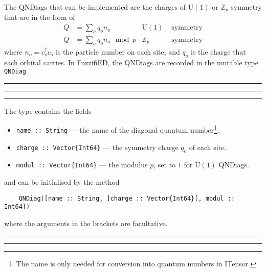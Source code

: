 \documentclass{timesjhep}
\newenvironment{block}[1]{\vspace{0.4\baselineskip}\hrule\vspace{0.10\baselineskip}\hrule\vspace{0.30\baselineskip}{\bfseries #1}\vspace{0.2\baselineskip}\hrule\vspace{0.3\baselineskip}
}{\vspace{0.2\baselineskip}\hrule\vspace{0.10\baselineskip}\hrule\vspace{0.5\baselineskip}}
\begin{document}
The QNDiags that can be implemented are the charges of $\mathrm{U}(1)$ or $\mathbb{Z}_p$ symmetry that are in the form of 
\begin{align}
    Q&=\sum_oq_on_o&\mathrm{U}(1)&\textrm{ symmetry}\nonumber\\
    Q&=\sum_oq_on_o\mod p&\mathbb{Z}_p&\textrm{ symmetry}
\end{align}
where $n_o=c^\dagger_oc_o$ is the particle number on each site, and $q_o$ is the charge that each orbital carries. In FuzzifiED, the QNDiags are recorded in the mutable type \lstinline|QNDiag|

\begin{block}{\lstinline|QNDiag| --- Type}
The type contains the fields
\begin{itemize}
    \item \lstinline|name :: String| --- the name of the diagonal quantum number\footnote{The name is only needed for conversion into quantum numbers in ITensor.}.
    \item \lstinline|charge :: Vector{Int64}| --- the symmetry charge $q_o$ of each site.
    \item \lstinline|modul :: Vector{Int64}| --- the modulus $p$, set to $1$ for $\mathrm{U}(1)$ QNDiags. 
\end{itemize}
and can be initialised by the method 
\begin{lstlisting}
    QNDiag([name :: String, ]charge :: Vector{Int64}[, modul :: Int64])
\end{lstlisting}
where the arguments in the brackets are facultative. 
\end{block}
\end{document}
